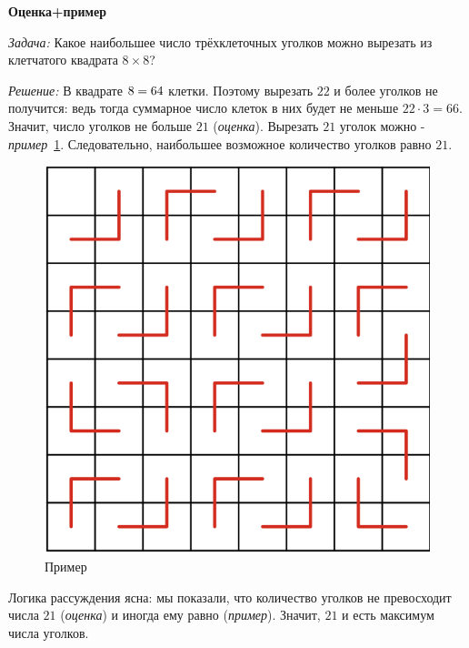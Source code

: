 \documentclass{article}
\begin{document}
    \large

    \begin{center}
        \textbf{Оценка+пример}
    \end{center}

    \textit{Задача:} Какое наибольшее число трёхклеточных уголков можно вырезать из клетчатого квадрата $8 \times 8$?

    \textit{Решение:} В квадрате $8 \time 8=64$ клетки.
    Поэтому вырезать $22$ и более уголков не получится: ведь тогда суммарное число клеток в них будет не меньше $22\cdot 3 = 66$.
    Значит, число уголков не больше $21$ (\textit{оценка}).
    Вырезать $21$ уголок можно - \textit{пример}~\ref{ris:1}.
    Следовательно, наибольшее возможное количество уголков равно $21$.

    \begin{figure}[h]
        \begin{center}
            \includegraphics[width=0.3\linewidth]{primer}
            \caption{Пример} %
            \label{ris:1} %
        \end{center}
    \end{figure}

    Логика рассуждения ясна: мы показали, что количество уголков не превосходит числа $21$
    (\textit{оценка}) и иногда ему равно (\textit{пример}). Значит, $21$ и есть максимум числа уголков.
\end{document}

